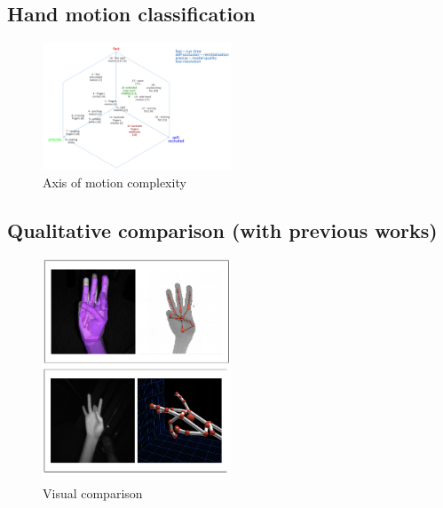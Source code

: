 \documentclass[tog]{acmsiggraph}
\begin{document}
\subsection{Hand motion classification}
\begin{figure}[h!] 
	\centering
	\includegraphics[width=0.5\textwidth]{fig/draft/draft_hand_motion_classification}
	\caption{Axis of motion complexity}
	\label{fig:modeling}
\end{figure}
\subsection{Qualitative comparison (with previous works)}
\begin{figure}[h!] 
	\centering
	\includegraphics[width=0.5\textwidth]{fig/draft/draft_visual_comparison}
	\caption{Visual comparison}
	\label{fig:modeling}
\end{figure}






\appendix
% 
\end{document}
